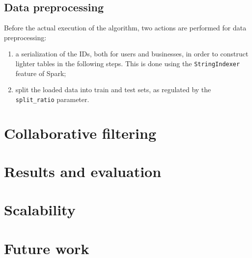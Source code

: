 \documentclass[11pt,a4paper]{article}
\newcommand{\code}{\texttt}
\begin{document}
\begin{multicols}{2}
\subsection{Data preprocessing}
Before the actual execution of the algorithm, two actions are performed for data preprocessing:
\begin{enumerate}
	\item a serialization of the IDs, both for users and businesses, in order to construct lighter tables in the following steps. This is done using the \code{StringIndexer} feature of Spark;
	\item split the loaded data into train and test sets, as regulated by the \code{split\_ratio} parameter.
\end{enumerate}



\label{collabfiltering}
\section{Collaborative filtering}



\label{evaluation}
\section{Results and evaluation}



\label{scalability}
\section{Scalability}



\label{futurework}
\section{Future work}


\end{multicols}
\end{document}
